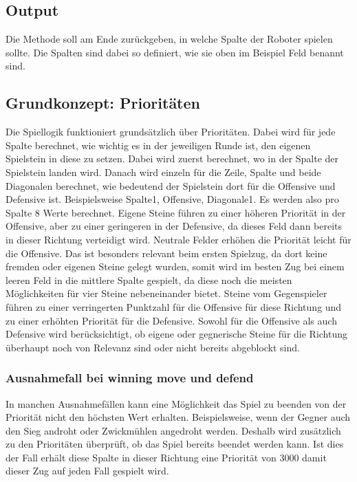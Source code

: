 \subsection{Output}
Die Methode soll am Ende zurückgeben, in welche Spalte der Roboter spielen sollte. Die Spalten sind dabei so definiert, wie sie oben im Beispiel Feld benannt sind. 

\subsection{Grundkonzept: Prioritäten}
Die Spiellogik funktioniert grundsätzlich über Prioritäten. Dabei wird für jede Spalte berechnet, wie wichtig es in der jeweiligen Runde ist, den eigenen Spielstein in diese zu setzen. Dabei wird zuerst berechnet, wo in der Spalte der Spielstein landen wird. Danach wird einzeln für die Zeile, Spalte und beide Diagonalen berechnet, wie bedeutend der Spielstein dort für die Offensive und Defensive ist. Beispielsweise Spalte1, Offensive, Diagonale1. Es werden also pro Spalte 8 Werte berechnet.
Eigene Steine führen zu einer höheren Priorität in der Offensive, aber zu einer geringeren in der Defensive, da dieses Feld dann bereits in dieser Richtung verteidigt wird. Neutrale Felder erhöhen die Priorität leicht für die Offensive. Das ist besonders relevant beim ersten Spielzug, da dort keine fremden oder eigenen Steine gelegt wurden, somit wird im besten Zug bei einem leeren Feld in die mittlere Spalte gespielt, da diese noch die meisten Möglichkeiten für vier Steine nebeneinander bietet. Steine vom Gegenspieler führen zu einer verringerten Punktzahl für die Offensive für diese Richtung und zu einer erhöhten Priorität für die Defensive. Sowohl für die Offensive als auch Defensive wird berücksichtigt, ob eigene oder gegnerische Steine für die Richtung überhaupt noch von Relevanz sind oder nicht bereits abgeblockt sind.

\subsubsection{Ausnahmefall bei winning move und defend}
In manchen Ausnahmefällen kann eine Möglichkeit das Spiel zu beenden von der Priorität nicht den höchsten Wert erhalten. Beispielsweise, wenn der Gegner auch den Sieg androht oder Zwickmühlen angedroht werden. Deshalb wird zusätzlich zu den Prioritäten überprüft, ob das Spiel bereits beendet werden kann. Ist dies der Fall erhält diese Spalte in dieser Richtung eine Priorität von 3000 damit dieser Zug auf jeden Fall gespielt wird.


